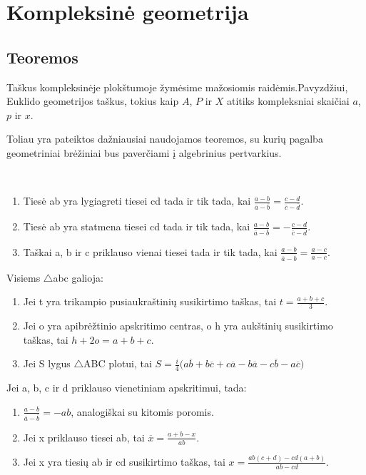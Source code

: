 \section{Kompleksinė geometrija}
\subsection{Teoremos}

Taškus kompleksinėje plokštumoje žymėsime mažosiomis raidėmis.Pavyzdžiui, 
Euklido geometrijos taškus, tokius kaip $A$, $P$ ir $X$ atitiks kompleksniai skaičiai $a$, $p$ ir $x$.

Toliau yra pateiktos dažniausiai naudojamos teoremos, su kurių pagalba
geometriniai brėžiniai bus paverčiami į algebrinius pertvarkius.

\begin{thmnr}\ 
\begin{enumerate}
\item Tiesė ab yra lygiagreti tiesei cd tada ir tik tada, kai $\frac{a - b}{\overline{a} -\overline{b}}=\frac{c - d}{\overline{c} - \overline{d}}$.
\item Tiesė ab yra statmena tiesei cd tada ir tik tada, kai $\frac{a - b}{\overline{a} -\overline{b}}=-\frac{c - d}{\overline{c} - \overline{d}}$.
\item Taškai a, b ir c priklauso vienai tiesei tada ir tik tada, kai $\frac{a - b}{\overline{a} -\overline{b}}=\frac{a-c}{\overline{a} - \overline{c}}$.
\end{enumerate}
\end{thmnr}

\begin{thmnr} Visiems $\bigtriangleup$abc galioja:\
\begin{enumerate}
\item Jei t yra trikampio pusiaukraštinių susikirtimo taškas, tai $t=\frac{a+b+c}{3}$.
\item Jei o yra apibrėžtinio apskritimo centras, o h yra aukštinių susikirtimo taškas, tai $h+2o=a+b+c$.
\item Jei S lygus $\bigtriangleup$ABC plotui, tai 
$S=\tfrac{i}{4}\Big(a\overline{b} +b\overline{c}+c\overline{a} - b\overline{a} -c\overline{b}-a\overline{c}\Big)$
\end{enumerate}
\end{thmnr}

\begin{thmnr}  Jei a, b, c ir d priklauso vienetiniam apskritimui, tada:\
\begin{enumerate}
\item $\frac{a - b}{\overline{a} -\overline{b}}=-ab$, analogiškai su kitomis poromis.
\item Jei x priklauso tiesei ab, tai $\overline{x}=\frac{a + b - x}{ab}$.
\item Jei x yra tiesių ab ir cd susikirtimo taškas, tai $x=\frac{ab(c+d) - cd(a+b)}{ab - cd}$.
\end{enumerate}
\end{thmnr}

